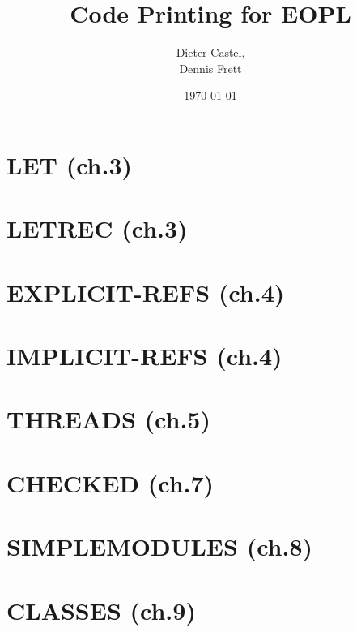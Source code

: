 \documentclass[11pt,a4paper,twoside]{article}
\title{Code Printing for EOPL}
\date{\today}
\author{Dieter Castel, \\ Dennis Frett}
\begin{document}
\maketitle
\tableofcontents
\section{LET (ch.3)}


\section{LETREC (ch.3)}


\section{EXPLICIT-REFS (ch.4)}


\section{IMPLICIT-REFS (ch.4)}


\section{THREADS (ch.5)}


\section{CHECKED (ch.7)}


\section{SIMPLEMODULES (ch.8)}


\section{CLASSES (ch.9)}


\nocite{*}
\printbibliography
\end{document}
